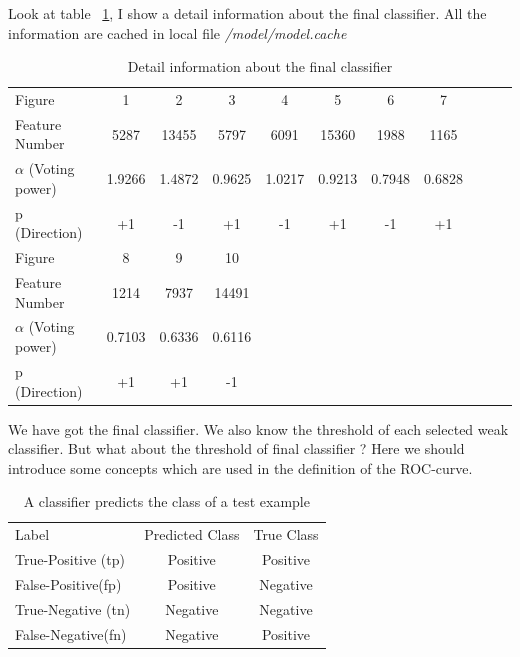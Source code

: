 \documentclass[a4paper, 11pt]{article} %
\begin{document}
Look at table ~\ref{table:finalClassifier}, I show a detail information about the final classifier. All the information are cached in local file \textit{/model/model.cache}
    \begin{table}[H]
        \centering
        \caption{Detail information about the final classifier}
        \begin{tabular}{l c c c c c c c c c c}
            \hline
            \hline
            Figure                  & 1     & 2     & 3     & 4     & 5     & 6     & 7     \\
            Feature Number          & 5287  & 13455 & 5797  & 6091  & 15360 & 1988  & 1165  \\
            $\alpha$ (Voting power) & 1.9266& 1.4872& 0.9625& 1.0217& 0.9213& 0.7948& 0.6828\\
            p (Direction)           & +1    & -1    & +1    & -1    & +1    & -1    & +1    \\
            Figure                  & 8     & 9     & 10    \\
            Feature Number          & 1214  & 7937  & 14491 \\
            $\alpha$ (Voting power) & 0.7103& 0.6336& 0.6116\\
            p (Direction)           & +1    & +1    & -1    \\
            \hline
        \end{tabular}
        \label{table:finalClassifier}
    \end{table}


    We have got the final classifier. We also know the threshold of each selected weak classifier. But what about the threshold of final classifier ? Here we should introduce some concepts which are used in the definition of the ROC-curve.

    \begin{table}[H]
        \centering
        \caption{A classifier predicts the class of a test example}
        \begin{tabular}{l c c}
            \hline
            \hline
            Label              & Predicted Class& True Class    \\
            True-Positive (tp) & Positive       & Positive      \\
            False-Positive(fp) & Positive       & Negative      \\
            True-Negative (tn) & Negative       & Negative      \\
            False-Negative(fn) & Negative       & Positive      \\
            \hline
        \end{tabular}
        \label{table:predicts}
    \end{table}
\end{document}
